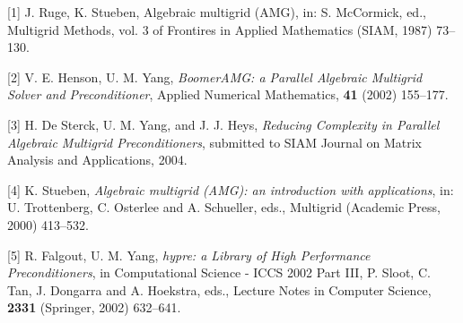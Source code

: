 \documentclass{report}
\begin{document}
[1] J. Ruge, K. Stueben, Algebraic multigrid (AMG), in: S. McCormick,
ed., Multigrid Methods, vol. 3 of Frontires in Applied Mathematics
(SIAM, 1987) 73--130.

[2] V. E. Henson, U. M. Yang,
{\em BoomerAMG: a Parallel Algebraic Multigrid
Solver and Preconditioner}, Applied Numerical Mathematics,
{\bf 41} (2002) 155--177.

[3] H. De Sterck, U. M. Yang, and J. J. Heys,
{\em Reducing Complexity in
Parallel Algebraic Multigrid Preconditioners}, submitted to SIAM Journal
on Matrix Analysis and Applications, 2004.

[4] K. Stueben, {\em Algebraic multigrid (AMG): an introduction with
applications}, in: U. Trottenberg, C. Osterlee and A. Schueller, eds.,
Multigrid (Academic Press, 2000) 413--532.

[5] R. Falgout, U. M. Yang, {\em hypre: a Library of High Performance
Preconditioners}, in Computational Science - ICCS 2002 Part III, P.
Sloot, C. Tan, J. Dongarra and A. Hoekstra, eds., Lecture Notes in
Computer Science, {\bf 2331} (Springer, 2002) 632--641.
\end{document}

